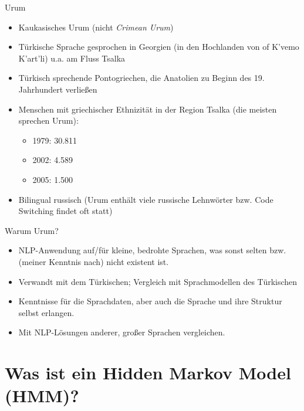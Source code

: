 \documentclass{beamer}
\begin{document}
\begin{frame}[t]{Urum}
	\begin{itemize}
		\item<1->Kaukasisches Urum (nicht \textit{Crimean Urum})
		\item<2->Türkische Sprache gesprochen in Georgien (in den Hochlanden von of K’vemo K’art’li) u.a. am Fluss Tsalka
		\item<3-> Türkisch sprechende Pontogriechen, die Anatolien zu Beginn des 19. Jahrhundert verließen
		\item<4->Menschen mit griechischer Ethnizität in der Region Tsalka (die meisten sprechen Urum):
		\begin{itemize}
			\item<5->1979: 30.811
			\item<6->2002: 4.589
			\item<7->2005: 1.500
		\end{itemize}
		\item<8->Bilingual russisch (Urum enthält viele russische Lehnwörter bzw. Code Switching findet oft statt)
	\end{itemize}
\end{frame}

\begin{frame}[t]{Warum Urum?}
\begin{itemize}
	\item<1->NLP-Anwendung auf/für kleine, bedrohte Sprachen, was sonst selten bzw. (meiner Kenntnis nach) nicht existent ist.
	\item<2->Verwandt mit dem Türkischen; Vergleich mit Sprachmodellen des Türkischen
	\item<3->Kenntnisse für die Sprachdaten, aber auch die Sprache und ihre Struktur selbst erlangen.
	\item<4-> Mit NLP-Lösungen anderer, großer Sprachen vergleichen.
\end{itemize}
\end{frame}

\section{Was ist ein Hidden Markov Model (HMM)?}
\end{document}
